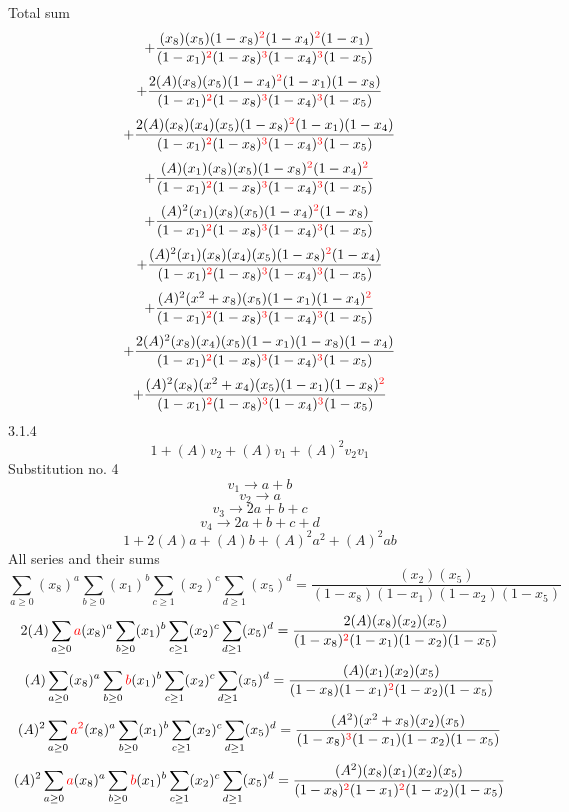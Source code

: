 \documentclass{article}
\begin{document}
Total sum
\[+\frac{(x_8)(x_5)(1-x_8)^{\textcolor{red}{2}}(1-x_4)^{\textcolor{red}{2}}(1-x_1)}{(1-x_1)^{\textcolor{red}{2}}(1-x_8)^{\textcolor{red}{3}}(1-x_4)^{\textcolor{red}{3}}(1-x_5)}\]\[+\frac{2(A)(x_8)(x_5)(1-x_4)^{\textcolor{red}{2}}(1-x_1)(1-x_8)}{(1-x_1)^{\textcolor{red}{2}}(1-x_8)^{\textcolor{red}{3}}(1-x_4)^{\textcolor{red}{3}}(1-x_5)}\]\[+\frac{2(A)(x_8)(x_4)(x_5)(1-x_8)^{\textcolor{red}{2}}(1-x_1)(1-x_4)}{(1-x_1)^{\textcolor{red}{2}}(1-x_8)^{\textcolor{red}{3}}(1-x_4)^{\textcolor{red}{3}}(1-x_5)}\]\[+\frac{(A)(x_1)(x_8)(x_5)(1-x_8)^{\textcolor{red}{2}}(1-x_4)^{\textcolor{red}{2}}}{(1-x_1)^{\textcolor{red}{2}}(1-x_8)^{\textcolor{red}{3}}(1-x_4)^{\textcolor{red}{3}}(1-x_5)}\]\[+\frac{(A)^{2}(x_1)(x_8)(x_5)(1-x_4)^{\textcolor{red}{2}}(1-x_8)}{(1-x_1)^{\textcolor{red}{2}}(1-x_8)^{\textcolor{red}{3}}(1-x_4)^{\textcolor{red}{3}}(1-x_5)}\]\[+\frac{(A)^{2}(x_1)(x_8)(x_4)(x_5)(1-x_8)^{\textcolor{red}{2}}(1-x_4)}{(1-x_1)^{\textcolor{red}{2}}(1-x_8)^{\textcolor{red}{3}}(1-x_4)^{\textcolor{red}{3}}(1-x_5)}\]\[+\frac{(A)^{2}(x^{2}+x_8)(x_5)(1-x_1)(1-x_4)^{\textcolor{red}{2}}}{(1-x_1)^{\textcolor{red}{2}}(1-x_8)^{\textcolor{red}{3}}(1-x_4)^{\textcolor{red}{3}}(1-x_5)}\]\[+\frac{2(A)^{2}(x_8)(x_4)(x_5)(1-x_1)(1-x_8)(1-x_4)}{(1-x_1)^{\textcolor{red}{2}}(1-x_8)^{\textcolor{red}{3}}(1-x_4)^{\textcolor{red}{3}}(1-x_5)}\]\[+\frac{(A)^{2}(x_8)(x^{2}+x_4)(x_5)(1-x_1)(1-x_8)^{\textcolor{red}{2}}}{(1-x_1)^{\textcolor{red}{2}}(1-x_8)^{\textcolor{red}{3}}(1-x_4)^{\textcolor{red}{3}}(1-x_5)}\]
3.1.4
\[1+(A)v_2+(A)v_1+(A)^2v_2v_1\]Substitution no. 4\[v_1\rightarrow{a+b}\]\[v_2\rightarrow{a}\]\[v_3\rightarrow{2a+b+c}\]\[v_4\rightarrow{2a+b+c+d}\]\[1+2(A)a+(A)b+(A)^2a^{2}+(A)^2ab\]All series and their sums\[\sum_{a\geq{0}}(x_8)^{a}\sum_{b\geq{0}}(x_1)^{b}\sum_{c\geq{1}}(x_2)^{c}\sum_{d\geq{1}}(x_5)^{d}=\frac{(x_2)(x_5)}{(1-x_8)(1-x_1)(1-x_2)(1-x_5)}\]\[2(A)\sum_{a\geq{0}}\textcolor{red}{a}(x_8)^{a}\sum_{b\geq{0}}(x_1)^{b}\sum_{c\geq{1}}(x_2)^{c}\sum_{d\geq{1}}(x_5)^{d}=\frac{2(A)(x_8)(x_2)(x_5)}{(1-x_8)^{\textcolor{red}{2}}(1-x_1)(1-x_2)(1-x_5)}\]\[(A)\sum_{a\geq{0}}(x_8)^{a}\sum_{b\geq{0}}\textcolor{red}{b}(x_1)^{b}\sum_{c\geq{1}}(x_2)^{c}\sum_{d\geq{1}}(x_5)^{d}=\frac{(A)(x_1)(x_2)(x_5)}{(1-x_8)(1-x_1)^{\textcolor{red}{2}}(1-x_2)(1-x_5)}\]\[(A)^{2}\sum_{a\geq{0}}\textcolor{red}{a^{2}}(x_8)^{a}\sum_{b\geq{0}}(x_1)^{b}\sum_{c\geq{1}}(x_2)^{c}\sum_{d\geq{1}}(x_5)^{d}=\frac{(A^{2})(x^{2}+x_8)(x_2)(x_5)}{(1-x_8)^{\textcolor{red}{3}}(1-x_1)(1-x_2)(1-x_5)}\]\[(A)^{2}\sum_{a\geq{0}}\textcolor{red}{a}(x_8)^{a}\sum_{b\geq{0}}\textcolor{red}{b}(x_1)^{b}\sum_{c\geq{1}}(x_2)^{c}\sum_{d\geq{1}}(x_5)^{d}=\frac{(A^{2})(x_8)(x_1)(x_2)(x_5)}{(1-x_8)^{\textcolor{red}{2}}(1-x_1)^{\textcolor{red}{2}}(1-x_2)(1-x_5)}\]
\end{document}
